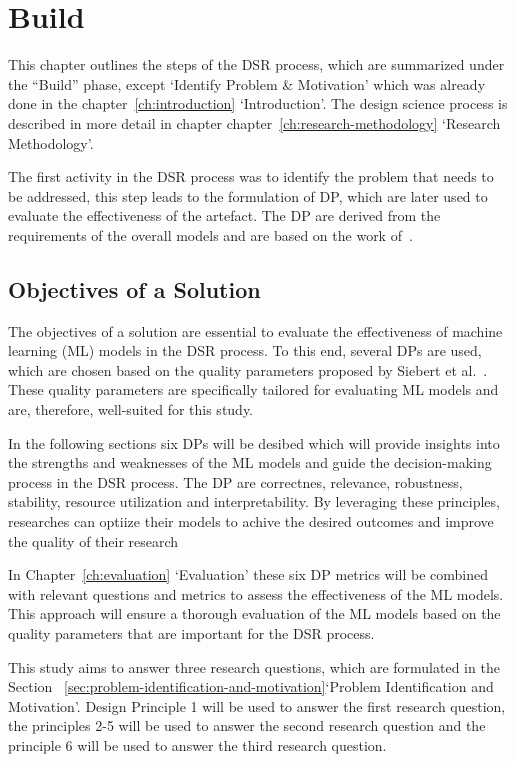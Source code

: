 \chapter{Build}\label{ch:build}
This chapter outlines the steps of the \ac{DSR} process, which are
summarized under the ``Build'' phase, except `Identify Problem \& Motivation' which was already done in the
chapter~\ref{ch:introduction} `Introduction'.
The design science process is described in more detail in chapter
chapter~\ref{ch:research-methodology} `Research Methodology'.

The first activity in the DSR process was to identify the problem that needs to be addressed,
this step leads to the formulation of \ac{DP}, which are later used to evaluate
the effectiveness of the artefact.
The \ac{DP} are derived from the requirements of the overall models and are based on
the work of~\cite{siebert2022construction}.


\section{Objectives of a Solution}\label{sec:objectives-of-a-solution}

The objectives of a solution are essential to evaluate the effectiveness of machine learning (ML) models in the
DSR process.
To this end, several DPs are used, which are chosen based on the quality parameters proposed by Siebert et
al.~\cite{siebert2022construction}.
These quality parameters are specifically tailored for evaluating ML models and are, therefore, well-suited for this
study.

In the following sections six DPs will be desibed which will provide insights into the strengths and weaknesses of the
ML models and guide the decision-making process in the DSR process.
The \ac{DP} are correctnes, relevance, robustness, stability, resource utilization and interpretability.
By leveraging these principles, researches can optiize their models to achive the desired outcomes and improve the
quality of their research

In Chapter~\ref{ch:evaluation} `Evaluation' these six DP metrics will be combined with relevant questions and metrics to
assess the effectiveness of the ML models.
This approach will ensure a thorough evaluation of the ML models based on the quality parameters that are important
for the DSR process.

This study aims to answer three research questions, which are formulated in the
Section ~\ref{sec:problem-identification-and-motivation}`Problem Identification and Motivation'.
Design Principle 1 will be used to answer the first research question, the principles 2-5 will be used to answer the
second research question and the principle 6 will be used to answer the third research question.

